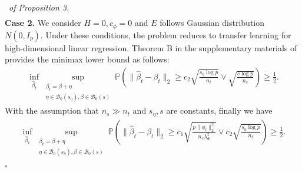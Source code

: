 \documentclass[12pt]{article}
\newenvironment{pf}{{\noindent \it Proof}\ }{\hfill $\square$\par}
\begin{document}
\begin{pf}{\it of Proposition 3. }
\begin{align*}
    \end{align*}
    \textbf{Case 2.} We consider $H=0,c_\phi=0$ and $E$ follows Gaussian distribution $N(0,I_p)$. Under these conditions, the problem reduces to transfer learning for high-dimensional linear regression. Theorem B in the supplementary materials of \cite{li2022transfer} provides the minimax lower bound as follows:
    \begin{align*}
        \inf_{\hat{\beta}_t}\underset{\substack{\beta_t=\beta+\eta\\\eta\in \mathcal{B}_0(s_\eta),\beta\in \mathcal{B}_0(s)}}{\sup}\mathbb{P}\left(\|\hat{\beta}_t-\beta_t\|_2 \ge c_2\sqrt{\frac{s_\eta \log p}{n_t}} \vee \sqrt{\frac{s\log p}{n_s}}\right) \ge  \frac{1}{2}. 
    \end{align*}
    With the assumption that $n_s\gg n_t$ and $s_\eta,s$ are constants, finally we have
    \begin{align*}
        \inf_{\hat{\beta}_t}\underset{\substack{\beta_t=\beta+\eta\\\eta\in \mathcal{B}_0(s_\eta),\beta\in \mathcal{B}_0(s)}}{\sup}\mathbb{P}\left(\|\hat{\beta}_t-\beta_t\|_2 \ge c_1\sqrt{\frac{p\|\phi_t\|_2^2}{n_s\lambda_\Psi^2}}\vee c_2\sqrt{\frac{s_\eta \log p}{n_t}} \right) \ge  \frac{1}{2}. 
    \end{align*}
\end{pf}
\end{document}
